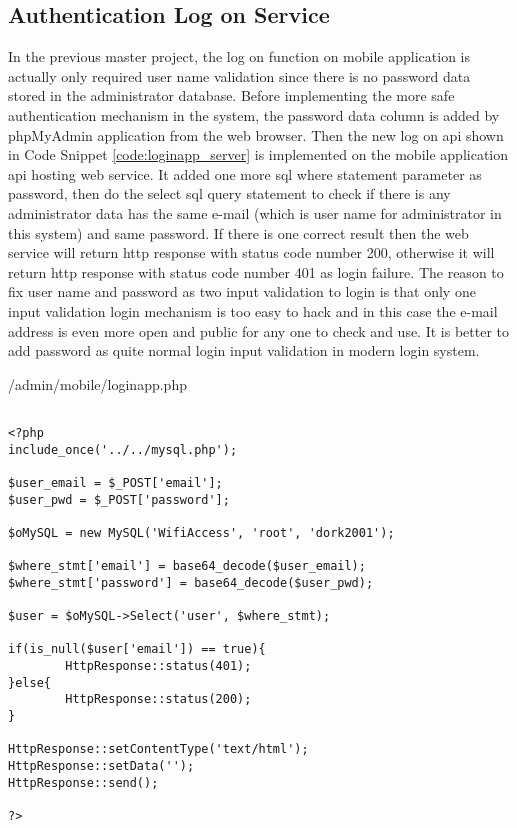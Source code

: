 \subsection{Authentication Log on Service}
\par In the previous master project, the log on function on mobile application is actually only required user name validation since there is no password data stored in the administrator database. Before implementing the more safe authentication mechanism in the system, the password data column is added by phpMyAdmin application from the web browser. Then the new log on \gls{api} shown in Code Snippet \ref{code:loginapp_server} is implemented on the mobile application \gls{api} hosting web service. It added one more \gls{sql} where statement parameter as password, then do the select \gls{sql} query statement to check if there is any administrator data has the same e-mail (which is user name for administrator in this system) and same password. If there is one correct result then the web service will return \gls{http} response with status code number 200, otherwise it will return \gls{http} response with status code number 401 as login failure. The reason to fix user name and password as two input validation to login is that only one input validation login mechanism is too easy to hack and in this case the e-mail address is even more open and public for any one to check and use. It is better to add password as quite normal login input validation in modern login system.

\begin{algorithm}[h]
  \caption{ /admin/mobile/loginapp.php}
  \label{code:loginapp_server}
  \begin{verbatim}
  
<?php
include_once('../../mysql.php');

$user_email = $_POST['email'];
$user_pwd = $_POST['password'];

$oMySQL = new MySQL('WifiAccess', 'root', 'dork2001');

$where_stmt['email'] = base64_decode($user_email);
$where_stmt['password'] = base64_decode($user_pwd);

$user = $oMySQL->Select('user', $where_stmt);

if(is_null($user['email']) == true){
        HttpResponse::status(401);
}else{
        HttpResponse::status(200);
}

HttpResponse::setContentType('text/html');
HttpResponse::setData('');
HttpResponse::send();

?>
 \end{verbatim}
\end{algorithm}

